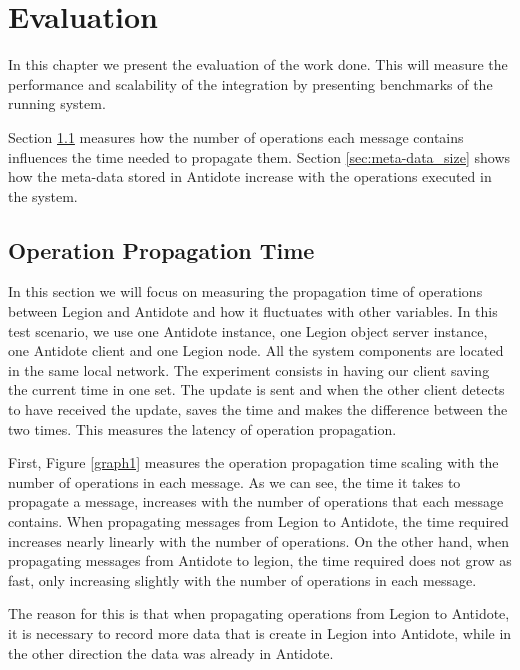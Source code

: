 \chapter{Evaluation}
\label{cha:evaluation}
In this chapter we present the evaluation of the work done. This will measure the performance and scalability of the integration by presenting benchmarks of the running system.\par
	Section \ref{sec:operation_propagation_time} measures how the number of operations each message contains influences the time needed to propagate them. Section \ref{sec:meta-data_size} shows how the meta-data stored in Antidote increase with the operations executed in the system.

\section{Operation Propagation Time}
\label{sec:operation_propagation_time}
In this section we will focus on measuring the propagation time of operations between Legion and Antidote and how it fluctuates with other variables. In this test scenario, we use one Antidote instance, one Legion object server instance, one Antidote client and one Legion node. All the system components are located in the same local network. The experiment consists in having our client saving the current time in one set. The update is sent and when the other client detects to have received the update, saves the time and makes the difference between the two times. This measures the latency of operation propagation.\par
	First, Figure \ref{graph1} measures the operation propagation time scaling with the number of operations in each message. As we can see, the time it takes to propagate a message, increases with the number of operations that each message contains. When propagating messages from Legion to Antidote, the time required increases nearly linearly with the number of operations. On the other hand, when propagating messages from Antidote to legion, the time required does not grow as fast, only increasing slightly with the number of operations in each message.\par
	The reason for this is that when propagating operations from Legion to Antidote, it is necessary to record more data that is create in Legion into Antidote, while in the other direction the data was already in Antidote.

